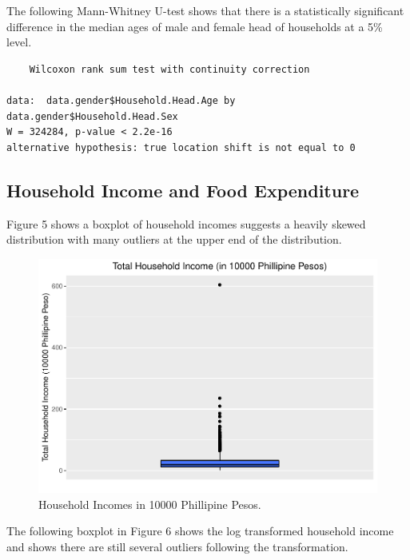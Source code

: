 \documentclass[
]{article}
\begin{document}
The following Mann-Whitney U-test shows that there is a statistically
significant difference in the median ages of male and female head of
households at a 5\% level.

\begin{verbatim}
    Wilcoxon rank sum test with continuity correction

data:  data.gender$Household.Head.Age by data.gender$Household.Head.Sex
W = 324284, p-value < 2.2e-16
alternative hypothesis: true location shift is not equal to 0
\end{verbatim}

\hypertarget{household-income-and-food-expenditure}{%
\subsection{Household Income and Food
Expenditure}\label{household-income-and-food-expenditure}}

Figure 5 shows a boxplot of household incomes suggests a heavily skewed
distribution with many outliers at the upper end of the distribution.

\begin{figure}[H]

{\centering \includegraphics[width=0.8\linewidth]{Group_01_Project2_demo_files/figure-latex/balance boxplot-1} 

}

\caption{Household Incomes in 10000 Phillipine Pesos.}\label{fig:balance boxplot}
\end{figure}

The following boxplot in Figure 6 shows the log transformed household
income and shows there are still several outliers following the
transformation.
\end{document}
